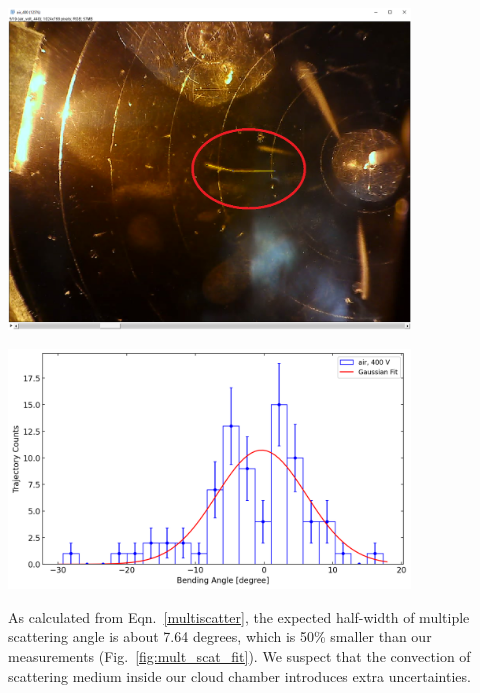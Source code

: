 \documentclass[letterpaper,12pt]{article}
\begin{document}
\begin{center}
    \includegraphics[width=0.8\textwidth]{figures/multiple_scatter.png}
    \label{fig:mult_scat}
\end{center}

\begin{center}
    \includegraphics[width=0.8\textwidth]{figures/multiple_scattering_fit.png}
    \label{fig:mult_scat_fit}
\end{center}

As calculated from Eqn.~\eqref{multiscatter}, the expected half-width of multiple scattering angle is about 7.64 degrees, which is 50\% smaller than our measurements (Fig.~\ref{fig:mult_scat_fit}). We suspect that the convection of scattering medium inside our cloud chamber introduces extra uncertainties. 
\end{document}
